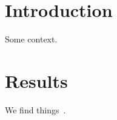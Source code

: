 \documentclass{article}
\begin{document}
\section{Introduction}
Some context.
\section{Results}
We find things~\cite{a}.

\end{document}
